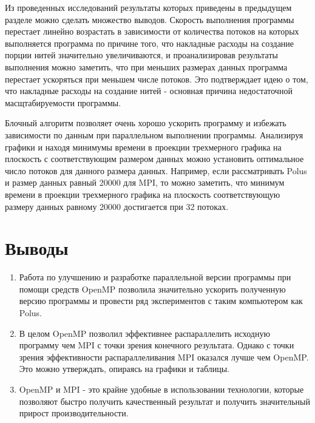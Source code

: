 \documentclass{article}
\begin{document}
Из проведенных исследований результаты которых приведены в предыдущем
разделе можно сделать множество выводов.
Скорость выполнения программы перестает линейно возрастать в зависимости
от количества потоков на которых выполняется программа по причине того, что
накладные расходы на создание порции нитей значительно увеличиваются, и
проанализировав результаты выполнения можно заметить, что при меньших размерах данных программа перестает ускоряться при меньшем числе потоков. Это
подтверждает идею о том, что накладные расходы на создание нитей - основная
причина недостаточной масщтабируемости программы.

Блочный алгоритм позволяет очень хорошо ускорить программу и избежать
зависимости по данным при параллельном выполнении программы.
Анализируя графики и находя минимумы времени в проекции трехмерного
графика на плоскость с соответствующим размером данных можно установить
оптимальное число потоков для данного размера данных. Например, если
рассматривать Polus и размер данных равный 20000 для MPI, то можно заметить, что минимум времени в проекции трехмерного графика на плоскость соответствующую размеру данных равному 20000 достигается при 32 потоках.

\newpage

\section{Выводы}

\begin{enumerate}
    \item Работа по улучшению и разработке параллельной версии программы при помощи средств OpenMP позволила значительно ускорить полученную версию программы и провести ряд экспериментов с таким компьютером как Polus.

    \item В целом OpenMP позволил эффективнее распараллелить исходную программу чем MPI с точки зрения конечного результата. Однако с точки зрения эффективности распараллеливания MPI оказался лучше чем OpenMP. Это можно утверждать, опираясь на графики и таблицы.

    \item OpenMP и MPI - это крайне удобные в использовании технологии, которые позволяют быстро получить качественный результат и получить значительный прирост производительности.
\end{enumerate}
\end{document}
